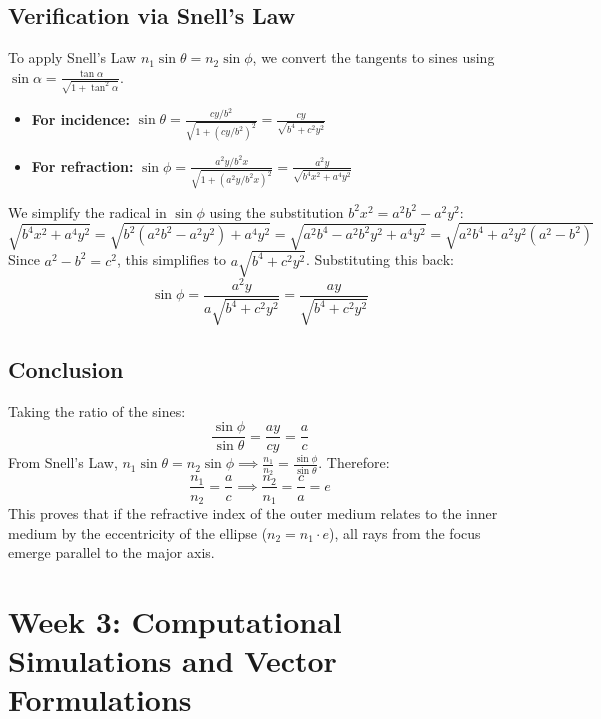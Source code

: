 \documentclass{article}
\begin{document}
\subsection{Verification via Snell's Law}
To apply Snell's Law $n_1 \sin \theta = n_2 \sin \phi$, we convert the tangents to sines using $\sin \alpha = \frac{\tan \alpha}{\sqrt{1+\tan^2 \alpha}}$.
\begin{itemize}
    \item \textbf{For incidence:} $\sin \theta = \frac{cy/b^2}{\sqrt{1 + (cy/b^2)^2}} = \frac{cy}{\sqrt{b^4 + c^2y^2}}$
    \item \textbf{For refraction:} $\sin \phi = \frac{a^2y/b^2x}{\sqrt{1 + (a^2y/b^2x)^2}} = \frac{a^2y}{\sqrt{b^4x^2 + a^4y^2}}$
\end{itemize}
We simplify the radical in $\sin \phi$ using the substitution $b^2x^2 = a^2b^2 - a^2y^2$:
\begin{equation}
    \sqrt{b^4x^2 + a^4y^2} = \sqrt{b^2(a^2b^2 - a^2y^2) + a^4y^2} = \sqrt{a^2b^4 - a^2b^2y^2 + a^4y^2} = \sqrt{a^2b^4 + a^2y^2(a^2-b^2)}
\end{equation}
Since $a^2 - b^2 = c^2$, this simplifies to $a\sqrt{b^4 + c^2y^2}$. Substituting this back:
\begin{equation}
    \sin \phi = \frac{a^2y}{a\sqrt{b^4 + c^2y^2}} = \frac{ay}{\sqrt{b^4 + c^2y^2}}
\end{equation}

\subsection{Conclusion}
Taking the ratio of the sines:
\begin{equation}
    \frac{\sin \phi}{\sin \theta} = \frac{ay}{cy} = \frac{a}{c}
\end{equation}
From Snell's Law, $n_1 \sin \theta = n_2 \sin \phi \implies \frac{n_1}{n_2} = \frac{\sin \phi}{\sin \theta}$. Therefore:
\begin{equation}
    \frac{n_1}{n_2} = \frac{a}{c} \implies \frac{n_2}{n_1} = \frac{c}{a} = e
\end{equation}
This proves that if the refractive index of the outer medium relates to the inner medium by the eccentricity of the ellipse ($n_2 = n_1 \cdot e$), all rays from the focus emerge parallel to the major axis. 

\section{Week 3: Computational Simulations and Vector Formulations}
\end{document}
